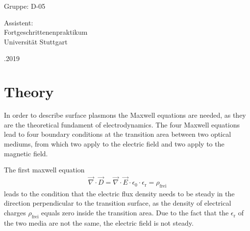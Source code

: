 \documentclass[ twoside,openright,titlepage,%
                paper=a4,fontsize=11pt,%
                ngerman
                ]{scrartcl}
\numberwithin{equation}{section}
\begin{document}
\begin{titlepage}
    \begin{addmargin}[-1cm]{-3cm}
    \begin{center}
        \large

        \hfill


        \begingroup
            \spacedallcaps{} \\ \bigskip
        \endgroup

	 \\
	Gruppe: D-05

        \vfill


        Assistent: \\ \medskip
	Fortgeschrittenenpraktikum \\
        Universität Stuttgart\\ \bigskip

	.2019 

        \vfill

    \end{center}
  \end{addmargin}
\end{titlepage}
\tableofcontents
\section{Theory}
In order to describe surface plasmons the Maxwell equations are needed, as they are the theoretical fundament of electrodynamics. The four Maxwell equations lead to four boundary conditions at the transition area between two optical mediums, from which two apply to the electric field and two apply to the magnetic field. 

The first maxwell equation
\begin{align}
\vec{\nabla} \cdot \vec{D} = \vec{\nabla} \cdot \vec{E}\cdot \epsilon_0 \cdot \epsilon_\text{r} =  \rho_\text{frei} \label{eq:Maxwell1}
\end{align}
leads to the condition that the electric flux density needs to be steady in the direction perpendicular to the transition surface, as the density of electrical charges $\rho_\text{frei}$ equals zero inside the transition area. Due to the fact that the $\epsilon_\text{r}$ of the two media are not the same, the electric field is not steady.
\end{document}
